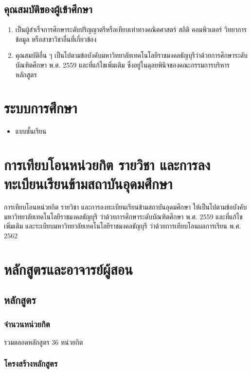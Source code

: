\subsection{คุณสมบัติของผู้เข้าศึกษา}
\begin{enumerate}
	\item เป็นผู้สำเร็จการศึกษาระดับปริญญาตรีหรือเทียบเท่าทางคณิตศาสตร์ สถิติ คอมพิวเตอร์ วิทยาการข้อมูล หรือสาขาวิชาอื่นที่เกี่ยวข้อง
	\item คุณสมบัติอื่น ๆ เป็นไปตามข้อบังคับมหาวิทยาลัยเทคโนโลยีราชมงคลธัญบุรีว่าด้วยการศึกษาระดับบัณฑิตศึกษา พ.ศ. 2559 และที่แก้ไขเพิ่มเติม ซึ่งอยู่ในดุลยพินิจของคณะกรรมการบริหารหลักสูตร
\end{enumerate}

\section{ระบบการศึกษา}
\begin{itemize}
	\item แบบชั้นเรียน
\end{itemize}

\section{การเทียบโอนหน่วยกิต รายวิชา และการลงทะเบียนเรียนข้ามสถาบันอุดมศึกษา}

การเทียบโอนหน่วยกิต รายวิชา และการลงทะเบียนเรียนข้ามสถาบันอุดมศึกษา ให้เป็นไปตามข้อบังคับมหาวิทยาลัยเทคโนโลยีราชมงคลธัญบุรี ว่าด้วยการศึกษาระดับบัณฑิตศึกษา พ.ศ. 2559 และที่แก้ไขเพิ่มเติม และระเบียบมหาวิทยาลัยเทคโนโลยีราชมงคลธัญบุรี ว่าด้วยการเทียบโอนผลการเรียน พ.ศ. 2562

\section{หลักสูตรและอาจารย์ผู้สอน}
\subsection{หลักสูตร}

\subsubsection{จำนวนหน่วยกิต}	
รวมตลอดหลักสูตร 36 หน่วยกิต

\subsubsection{โครงสร้างหลักสูตร}
 
